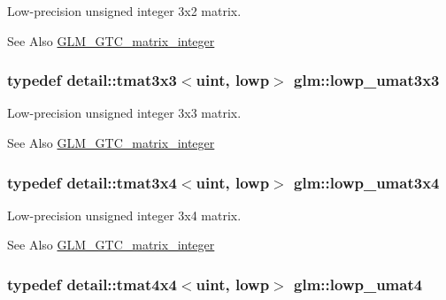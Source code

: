 Low-\/precision unsigned integer 3x2 matrix. \begin{DoxySeeAlso}{See Also}
\hyperlink{group__gtc__matrix__integer}{G\-L\-M\-\_\-\-G\-T\-C\-\_\-matrix\-\_\-integer} 
\end{DoxySeeAlso}
\hypertarget{group__gtc__matrix__integer_ga691694b1a4c6d1e613d8f1f707acc829}{
\subsubsection[{lowp\-\_\-umat3x3}]{\setlength{\rightskip}{0pt plus 5cm}typedef detail\-::tmat3x3$<$uint, lowp$>$ {\bf glm\-::lowp\-\_\-umat3x3}}}\label{group__gtc__matrix__integer_ga691694b1a4c6d1e613d8f1f707acc829}
Low-\/precision unsigned integer 3x3 matrix. \begin{DoxySeeAlso}{See Also}
\hyperlink{group__gtc__matrix__integer}{G\-L\-M\-\_\-\-G\-T\-C\-\_\-matrix\-\_\-integer} 
\end{DoxySeeAlso}
\hypertarget{group__gtc__matrix__integer_gad44577fcaebad47da39cc244566d7fe3}{
\subsubsection[{lowp\-\_\-umat3x4}]{\setlength{\rightskip}{0pt plus 5cm}typedef detail\-::tmat3x4$<$uint, lowp$>$ {\bf glm\-::lowp\-\_\-umat3x4}}}\label{group__gtc__matrix__integer_gad44577fcaebad47da39cc244566d7fe3}
Low-\/precision unsigned integer 3x4 matrix. \begin{DoxySeeAlso}{See Also}
\hyperlink{group__gtc__matrix__integer}{G\-L\-M\-\_\-\-G\-T\-C\-\_\-matrix\-\_\-integer} 
\end{DoxySeeAlso}
\hypertarget{group__gtc__matrix__integer_ga571dcc0328ddd1d8c54eba047b5bfa2f}{
\subsubsection[{lowp\-\_\-umat4}]{\setlength{\rightskip}{0pt plus 5cm}typedef detail\-::tmat4x4$<$uint, lowp$>$ {\bf glm\-::lowp\-\_\-umat4}}}\label{group__gtc__matrix__integer_ga571dcc0328ddd1d8c54eba047b5bfa2f}
